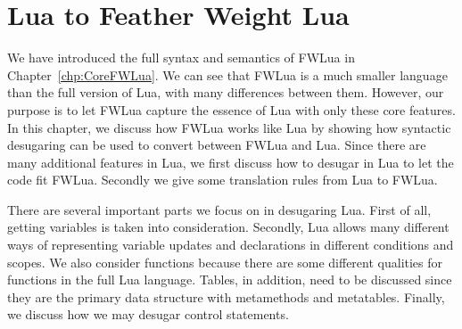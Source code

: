 \newcommand{\desugar}[2]{{#1} & \xlongequal[]{def} & {\begin{array}{@{}l@{}} #2 \end{array}}\\}
\newcommand{\definefunc}[2]{{#1} & \xlongequal[]{} & {\begin{array}{@{}l@{}} #2 \end{array}}\\}
\newcommand{\desugarline}[1]{ & & {\begin{array}{@{}l@{}} #1 \end{array}}\\}
\newcommand{\translate}[2]{\llbracket {#1} \rrbracket & \xlongequal[]{} & {\begin{array}{@{}l@{}} #2 \end{array}}\\}
\newcommand{\translateline}[1]{ &  & {\begin{array}{@{}l@{}} #1 \end{array}}\\}

\chapter{Lua to Feather Weight Lua}
\label{chp:luaTranslation}

We have introduced the full syntax and semantics of FWLua in Chapter~\ref{chp:CoreFWLua}. We can see that FWLua is a much smaller language than the full version of Lua, with many differences between them.
However, our purpose is to let FWLua capture the essence of Lua with only these core features.
In this chapter, we discuss how FWLua works like Lua by showing how syntactic desugaring can be used to convert between FWLua and Lua. Since there are many additional features in Lua, we first discuss how to desugar in Lua to let the code fit FWLua. Secondly we give some translation rules from Lua to FWLua.

There are several important parts we focus on in desugaring Lua. First of all, getting variables is taken into consideration. Secondly, Lua allows many different ways of representing variable updates and declarations in different conditions and scopes. We also consider functions because there are some different qualities for functions in the full Lua language. Tables, in addition, need to be discussed since they are the primary data structure with metamethods and metatables. Finally, we discuss how we may desugar control statements. 

